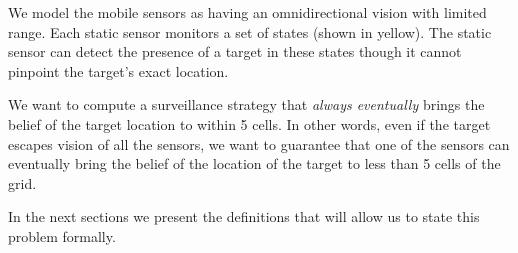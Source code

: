 We model the mobile sensors as having an omnidirectional vision with limited range. Each static sensor monitors a set of states (shown in yellow). The static sensor can detect the presence of a target in these states though it cannot pinpoint the target's exact location. 

We want to compute a surveillance strategy that \emph{always eventually} brings the belief of the target location to within 5 cells. In other words, even if the target escapes vision of all the sensors, we want to guarantee that one of the sensors can eventually bring the belief of the location of the target to less than 5 cells of the grid. 

In the next sections we present the definitions that will allow us to state this problem formally.